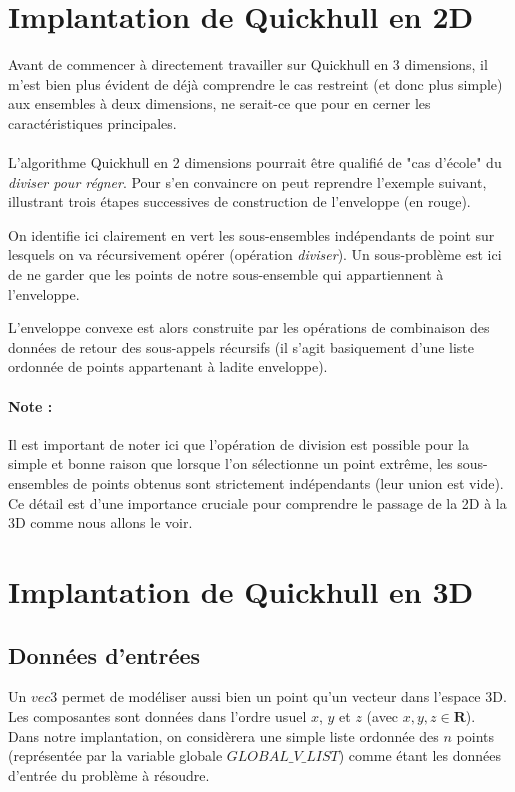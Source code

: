 \documentclass[]{article}
\begin{document}
\section{Implantation de Quickhull en 2D}
Avant de commencer à directement travailler sur Quickhull en 3 dimensions, il m'est bien plus évident de déjà comprendre le cas restreint (et donc plus simple) aux ensembles à deux dimensions, ne serait-ce que pour en cerner les caractéristiques principales.

\paragraph{}
L'algorithme Quickhull en 2 dimensions pourrait être qualifié de "cas d'école" du \emph{diviser pour régner}. Pour s'en convaincre on peut reprendre l'exemple suivant, illustrant trois étapes successives de construction de l'enveloppe (en rouge).

On identifie ici clairement en vert les sous-ensembles indépendants de point sur lesquels on va récursivement opérer (opération \emph{diviser}). Un sous-problème est ici de ne garder que les points de notre sous-ensemble qui appartiennent à l'enveloppe.

L'enveloppe convexe est alors construite par les opérations de combinaison des données de retour des sous-appels récursifs (il s'agit basiquement d'une liste ordonnée de points appartenant à ladite enveloppe).

\paragraph{Note :}
Il est important de noter ici que l'opération de division est possible pour la simple et bonne raison que lorsque l'on sélectionne un point extrême, les sous-ensembles de points obtenus sont strictement indépendants (leur union est vide). Ce détail est d'une importance cruciale pour comprendre le passage de la 2D à la 3D comme nous allons le voir.

\section{Implantation de Quickhull en 3D}
\subsection{Données d'entrées}
Un $vec3$ permet de modéliser aussi bien un point qu'un vecteur dans l'espace 3D. Les composantes sont données dans l'ordre usuel $x$, $y$ et $z$ (avec $x, y, z \in \mathbf{R}$).\\
Dans notre implantation, on considèrera une simple liste ordonnée des $n$ points (représentée par la variable globale $GLOBAL\_V\_LIST$) comme étant les données d'entrée du problème à résoudre.
\end{document}
